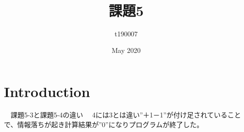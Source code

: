 \documentclass{article}
\title{課題5}
\author{t190007 }
\date{May 2020}
\begin{document}
\maketitle
\section{Introduction}
　課題5-3と課題5-4の違い
　4には3とは違い”＋1－1”が付け足されていることで、情報落ちが起き計算結果が”0”になりプログラムが終了した。
\end{document}
